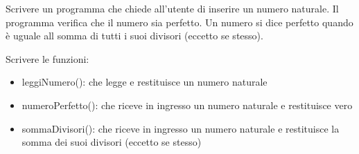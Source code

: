 \begin{Exercise}[label={ex:perfetti}]
    Scrivere un programma che chiede all’utente di inserire un numero naturale. Il programma verifica che il numero sia perfetto.
    Un numero si dice perfetto quando è uguale all somma di tutti i suoi divisori (eccetto se stesso).

    Scrivere le funzioni:
    \begin{itemize}
        \item leggiNumero(): che legge e restituisce un numero naturale
        \item numeroPerfetto(): che riceve in ingresso un numero naturale e restituisce vero
        \item sommaDivisori(): che riceve in ingresso un numero naturale e restituisce la somma dei suoi divisori (eccetto se stesso)
    \end{itemize}
\end{Exercise}

\begin{Answer}[ref={ex:perfetti}]
  	
\end{Answer}
